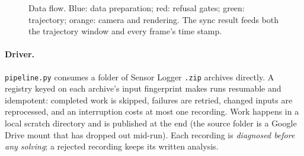 \documentclass[10pt,a4paper]{article}
\begin{document}
\begin{figure}[H]
\caption{Data flow. Blue: data preparation; red: refusal gates; green: trajectory; orange: camera and
rendering. The sync result feeds both the trajectory window and every frame's time stamp.}
\end{figure}

\paragraph{Driver.} \texttt{pipeline.py} consumes a folder of Sensor Logger \texttt{.zip} archives directly.
A registry keyed on each archive's input fingerprint makes runs resumable and idempotent: completed work
is skipped, failures are retried, changed inputs are reprocessed, and an interruption costs at most one
recording. Work happens in a local scratch directory and is published at the end (the source folder is a
Google Drive mount that has dropped out mid-run). Each recording is \emph{diagnosed before any solving};
a rejected recording keeps its written analysis.
\end{document}

